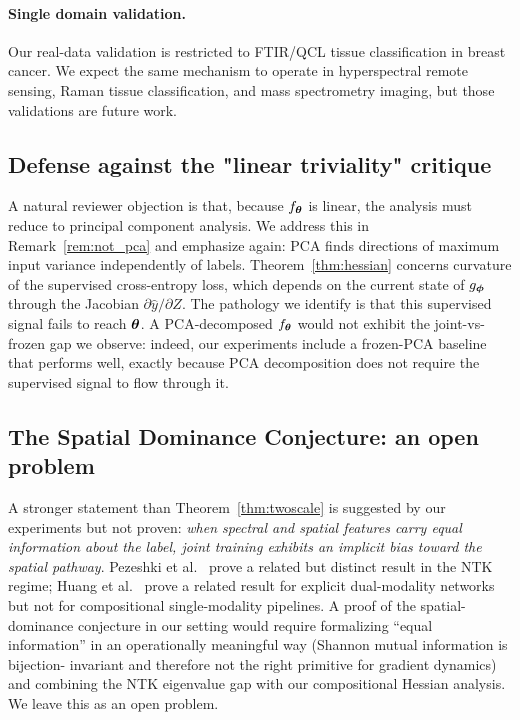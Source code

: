 \paragraph{Single domain validation.}
Our real-data validation is restricted to FTIR/QCL tissue classification
in breast cancer. We expect the same mechanism to operate in
hyperspectral remote sensing, Raman tissue classification, and mass
spectrometry imaging, but those validations are future work.

\subsection{Defense against the "linear triviality" critique}

A natural reviewer objection is that, because $f_{\boldsymbol{\theta}}$ is linear,
the analysis must reduce to principal component analysis. We address
this in Remark~\ref{rem:not_pca} and emphasize again: PCA finds
directions of maximum input variance independently of labels.
Theorem~\ref{thm:hessian} concerns curvature of the supervised
cross-entropy loss, which depends on the current state of $g_{\boldsymbol{\phi}}$
through the Jacobian $\partial \hat{y}/\partial Z$. The pathology we
identify is that this supervised signal fails to reach ${\boldsymbol{\theta}}$. A
PCA-decomposed $f_{\boldsymbol{\theta}}$ would not exhibit the joint-vs-frozen gap
we observe: indeed, our experiments include a frozen-PCA baseline that
performs well, exactly because PCA decomposition does not require the
supervised signal to flow through it.

\subsection{The Spatial Dominance Conjecture: an open problem}

A stronger statement than Theorem~\ref{thm:twoscale} is suggested by
our experiments but not proven: \emph{when spectral and spatial
features carry equal information about the label, joint training
exhibits an implicit bias toward the spatial pathway}. Pezeshki et
al.~\cite{pezeshki2021gradient} prove a related but distinct result in
the NTK regime; Huang et al.~\cite{huang2022modality} prove a related
result for explicit dual-modality networks but not for compositional
single-modality pipelines. A proof of the spatial-dominance conjecture
in our setting would require formalizing ``equal information'' in an
operationally meaningful way (Shannon mutual information is bijection-
invariant and therefore not the right primitive for gradient dynamics)
and combining the NTK eigenvalue gap with our compositional Hessian
analysis. We leave this as an open problem.

